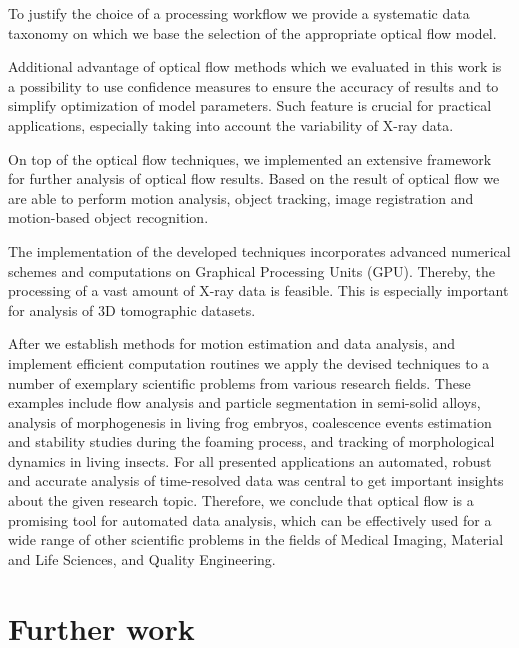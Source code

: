 To justify the choice of a processing workflow we provide a systematic data taxonomy on which we base the selection of the appropriate optical flow model. 

Additional advantage of optical flow methods which we evaluated in this work is a possibility to use  confidence measures to ensure the accuracy of results and to simplify optimization of model parameters.  Such feature is crucial for practical applications, especially taking into account the variability of X-ray data.

On top of the optical flow techniques, we implemented an extensive framework for further analysis of optical flow results. Based on the result of optical flow we are able to perform motion analysis, object tracking, image registration and motion-based object recognition. 

The implementation of the developed techniques incorporates advanced numerical schemes and computations on Graphical Processing Units (GPU). Thereby, the processing of a vast amount of X-ray data is feasible. This is especially important for analysis of 3D tomographic datasets.

After we establish methods for motion estimation and data analysis, and implement efficient computation routines we apply the devised techniques to a number of exemplary scientific problems from various research fields. These examples include flow analysis and particle segmentation in semi-solid alloys, analysis of morphogenesis in living frog embryos, coalescence events estimation and stability studies during the foaming process, and tracking of morphological dynamics in living insects. For all presented applications an automated, robust and accurate analysis of time-resolved  data was central to get important insights about the given research topic. Therefore, we conclude that optical flow is a promising tool for automated data analysis, which can be effectively used for a wide range of other scientific problems in the fields of Medical Imaging, Material and Life Sciences, and Quality Engineering.  

\newpage

\section{Further work}

